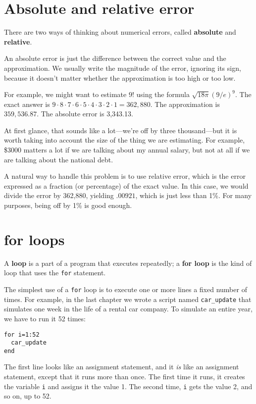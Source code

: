 \section{Absolute and relative error}

There are two ways of thinking about numerical errors, called {\bf
absolute} and {\bf relative}.

An absolute error is just the difference between the correct value and
the approximation. We usually write the magnitude of the error,
ignoring its sign, because it doesn't matter whether the approximation
is too high or too low.

For example, we might want to estimate $9!$ using the formula $\sqrt
{18 \pi} ( 9 / e)^9$. The exact answer is $9 \cdot 8 \cdot 7 \cdot 6
\cdot 5 \cdot 4 \cdot 3 \cdot 2 \cdot 1 = 362,880$. The approximation
is $359,536.87$. The absolute error is 3,343.13.

At first glance, that sounds like a lot---we're off by three
thousand---but it is worth taking into account the size of the
thing we are estimating. For example, \$3000 matters a lot
if we are talking about my annual salary, but not at all if we
are talking about the national debt.

A natural way to handle this problem is to use relative
error, which is the error expressed as a fraction (or percentage)
of the exact value. In this case, we would divide the error
by 362,880, yielding $.00921$, which is just less than 1\%.
For many purposes, being off by 1\% is good enough.


\section{for loops}

A {\bf loop} is a part of a program that executes repeatedly;
a {\bf for loop} is the kind of loop that uses the {\tt for}
statement.

The simplest use of a {\tt for} loop is to execute one or more
lines a fixed number of times. 
For example, in the last chapter
we wrote a script named {\tt car\_update} that simulates one
week in the life of a rental car company. To simulate an entire
year, we have to run it 52 times:

\begin{verbatim}
for i=1:52
  car_update
end
\end{verbatim}

The first line looks like an assignment statement, and it {\em is}
like an assignment statement, except that it runs more than once. The
first time it runs, it creates the variable {\tt i} and assigns it the
value 1. The second time, {\tt i} gets the value 2, and so on, up to
52.

